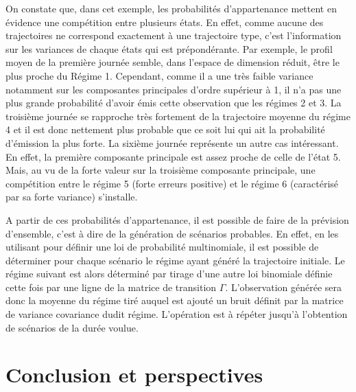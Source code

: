\documentclass[12pt]{report}
\begin{document}
On constate que, dans cet exemple, les probabilités d'appartenance mettent en évidence une compétition entre plusieurs états. En effet, comme aucune des trajectoires ne correspond exactement à une trajectoire type, c'est l'information sur les variances de chaque états qui est prépondérante. Par exemple, le profil moyen de la première journée semble, dans l'espace de dimension réduit, être le plus proche du Régime 1. Cependant, comme il a une très faible variance notamment sur les composantes principales d'ordre supérieur à 1, il n'a pas une plus grande probabilité d'avoir émis cette observation que les régimes 2 et 3. La troisième journée se rapproche très fortement de la trajectoire moyenne du régime 4 et il est donc nettement plus probable que ce soit lui qui ait la probabilité d'émission la plus forte. La sixième journée représente un autre cas intéressant. En effet, la première composante principale est assez proche de celle de l'état 5. Mais, au vu de la forte valeur sur la troisième composante principale, une compétition entre le régime 5 (forte erreurs positive) et le régime 6 (caractérisé par sa forte variance) s'installe.

A partir de ces probabilités d'appartenance, il est possible de faire de la prévision d'ensemble, c'est à dire de la génération de scénarios probables. En effet, en les utilisant pour définir une loi de probabilité multinomiale, il est possible de déterminer pour chaque scénario le régime ayant généré la trajectoire initiale. Le régime suivant est alors déterminé par tirage d'une autre loi binomiale définie cette fois par une ligne de la matrice de transition $\Gamma$. L'observation générée sera donc la moyenne du régime tiré auquel est ajouté un bruit définit par la matrice de variance covariance dudit régime. L'opération est à répéter jusqu'à l'obtention de scénarios de la durée voulue.   


\chapter{Conclusion et perspectives}



\end{document}
